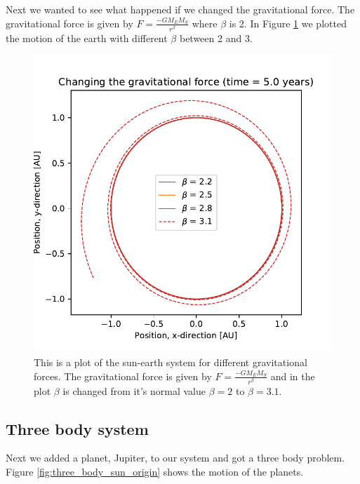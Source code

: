 Next we wanted to see what happened if we changed the gravitational force. The gravitational force is given by $ F = \frac{-GM_EM_S}{r^\beta}$ where $\beta$ is 2. In Figure \ref{fig:different_gravitation} we plotted the motion of the earth with different $\beta$ between 2 and 3.

\begin{figure}[H]
\includegraphics[width=0.9\linewidth]{../results/plots/diffenrent_gravitation.pdf}\caption{This is a plot of the sun-earth system for different gravitational forces. The gravitational force is given by $ F = \frac{-GM_EM_S}{r^\beta}$ and in the plot $\beta$ is changed from it's normal value $\beta = 2$ to $\beta = 3.1$.}\label{fig:different_gravitation}
\end{figure}

\subsection{Three body system}

Next we added a planet, Jupiter, to our system and got a three body problem. Figure \ref{fig:three_body_sun_origin} shows the motion of the planets.

